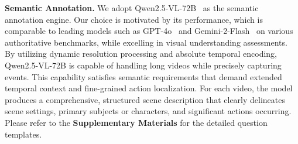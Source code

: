 \noindent\textbf{Semantic Annotation.}
We adopt Qwen2.5-VL-72B~\cite{bai2025qwen2} as the semantic annotation engine. 
Our choice is motivated by its performance, which is comparable to leading models such as GPT-4o~\cite{hurst2024gpt} and Gemini-2-Flash~\cite{deepmind2024gemini2} on various authoritative benchmarks, while excelling in visual understanding assessments.
By utilizing dynamic resolution processing and absolute temporal encoding, Qwen2.5-VL-72B is capable of handling long videos while precisely capturing events. This capability satisfies semantic requirements that demand extended temporal context and fine-grained action localization.
For each video, the model produces a comprehensive, structured scene description that clearly delineates scene settings, primary subjects or characters, and significant actions occurring.
Please refer to the \textbf{Supplementary Materials} for the detailed question templates.



